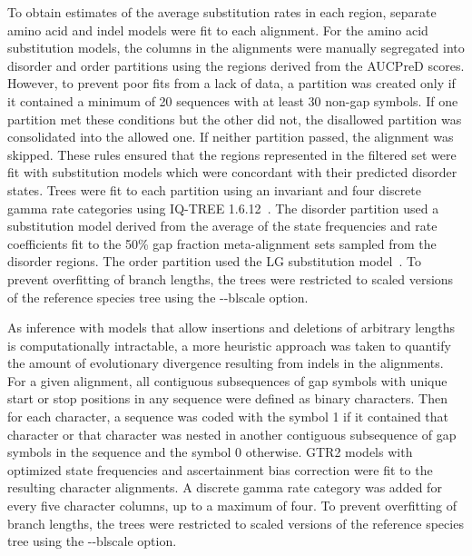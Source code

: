To obtain estimates of the average substitution rates in each region, separate amino acid and indel models were fit to each alignment. For the amino acid substitution models, the columns in the alignments were manually segregated into disorder and order partitions using the regions derived from the AUCPreD scores. However, to prevent poor fits from a lack of data, a partition was created only if it contained a minimum of 20 sequences with at least 30 non-gap symbols. If one partition met these conditions but the other did not, the disallowed partition was consolidated into the allowed one. If neither partition passed, the alignment was skipped. These rules ensured that the regions represented in the filtered set were fit with substitution models which were concordant with their predicted disorder states. Trees were fit to each partition using an invariant and four discrete gamma rate categories using IQ-TREE 1.6.12~\cite{Yang1994}. The disorder partition used a substitution model derived from the average of the state frequencies and rate coefficients fit to the 50\% gap fraction meta-alignment sets sampled from the disorder regions. The order partition used the LG substitution model~\cite{Le2008}. To prevent overfitting of branch lengths, the trees were restricted to scaled versions of the reference species tree using the -{}-blscale option.

As inference with models that allow insertions and deletions of arbitrary lengths is computationally intractable, a more heuristic approach was taken to quantify the amount of evolutionary divergence resulting from indels in the alignments. For a given alignment, all contiguous subsequences of gap symbols with unique start or stop positions in any sequence were defined as binary characters. Then for each character, a sequence was coded with the symbol 1 if it contained that character or that character was nested in another contiguous subsequence of gap symbols in the sequence and the symbol 0 otherwise. GTR2 models with optimized state frequencies and ascertainment bias correction were fit to the resulting character alignments. A discrete gamma rate category was added for every five character columns, up to a maximum of four. To prevent overfitting of branch lengths, the trees were restricted to scaled versions of the reference species tree using the -{}-blscale option.

